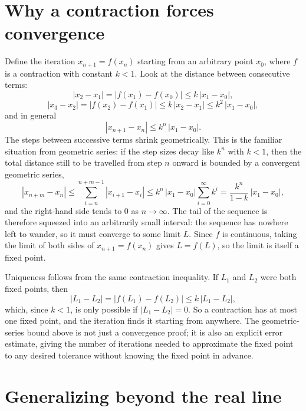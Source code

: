 \documentclass{essay}
\begin{document}
\section{Why a contraction forces convergence}

Define the iteration $x_{n+1} = f(x_n)$ starting from an arbitrary
point $x_0$, where $f$ is a contraction with constant $k < 1$. Look
at the distance between consecutive terms:
\[
  |x_2 - x_1| = |f(x_1) - f(x_0)| \le k\,|x_1 - x_0|,
\]
\[
  |x_3 - x_2| = |f(x_2) - f(x_1)| \le k\,|x_2 - x_1| \le k^2\,|x_1 - x_0|,
\]
and in general
\[
  |x_{n+1} - x_n| \le k^n\,|x_1 - x_0|.
\]
The steps between successive terms shrink geometrically. This is the
familiar situation from geometric series: if the step sizes decay
like $k^n$ with $k < 1$, then the total distance still to be
travelled from step $n$ onward is bounded by a convergent geometric
series,
\[
  |x_{n+m} - x_n|
  \le \sum_{i=n}^{n+m-1} |x_{i+1} - x_i|
  \le k^n\,|x_1 - x_0| \sum_{i=0}^{\infty} k^i
  = \frac{k^n}{1-k}\,|x_1 - x_0|,
\]
and the right-hand side tends to $0$ as $n \to \infty$. The tail of
the sequence is therefore squeezed into an arbitrarily small
interval: the sequence has nowhere left to wander, so it must
converge to some limit $L$. Since $f$ is continuous, taking the limit
of both sides of $x_{n+1} = f(x_n)$ gives $L = f(L)$, so the limit is
itself a fixed point.

Uniqueness follows from the same contraction inequality. If $L_1$ and
$L_2$ were both fixed points, then
\[
  |L_1 - L_2| = |f(L_1) - f(L_2)| \le k\,|L_1 - L_2|,
\]
which, since $k < 1$, is only possible if $|L_1 - L_2| = 0$. So a
contraction has at most one fixed point, and the iteration finds it
starting from anywhere. The geometric-series bound above is not just
a convergence proof; it is also an explicit error estimate, giving
the number of iterations needed to approximate the fixed point to any
desired tolerance without knowing the fixed point in advance.

\section{Generalizing beyond the real line}
\end{document}
